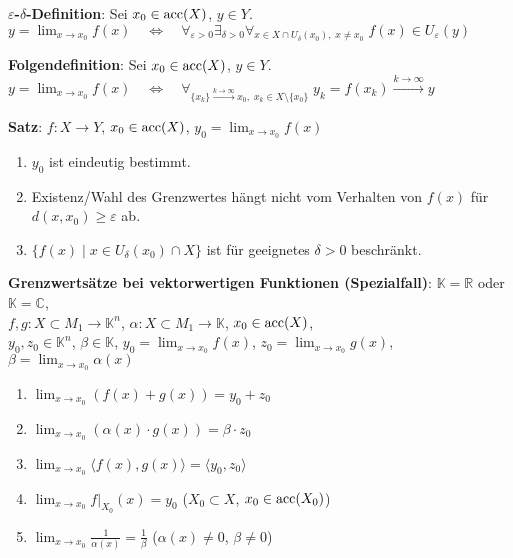 \textbf{$\varepsilon$-$\delta$-Definition}:
Sei $x_0 \in \operatorname{acc}(X)$, $y \in Y$. \\
$y = \lim_{x \to x_0} f(x) \quad\Leftrightarrow\quad
\forall_{\varepsilon > 0} \exists_{\delta > 0}
\forall_{x \in X \cap U_\delta(x_0),\; x \not= x_0}\;
f(x) \in U_\varepsilon(y)$

\textbf{Folgendefinition}:
Sei $x_0 \in \operatorname{acc}(X)$, $y \in Y$. \\
$y = \lim_{x \to x_0} f(x) \quad\Leftrightarrow\quad
\forall_{\{x_k\} \xrightarrow{k \to \infty} x_0,\;
x_k \in X \setminus \{x_0\}}\;
y_k = f(x_k) \xrightarrow{k \to \infty} y$

\linie

\textbf{Satz}: $f: X \rightarrow Y$,
$x_0 \in \operatorname{acc}(X)$, $y_0 = \lim_{x \to x_0} f(x)$

\begin{enumerate}
    \item $y_0$ ist eindeutig bestimmt.

    \item Existenz/Wahl des Grenzwertes hängt nicht vom Verhalten von
    $f(x)$ für $d(x,x_0) \ge \varepsilon$ ab.

    \item $\{f(x) \;|\; x \in U_\delta(x_0) \cap X\}$ ist für geeignetes
    $\delta > 0$ beschränkt.
\end{enumerate}

\linie
\pagebreak

\textbf{Grenzwertsätze bei vektorwertigen Funktionen (Spezialfall)}:
$\mathbb{K} = \mathbb{R}$ oder $\mathbb{K} = \mathbb{C}$, \\
$f, g: X \subset M_1 \rightarrow \mathbb{K}^n$, \quad
$\alpha: X \subset M_1 \rightarrow \mathbb{K}$, \quad
$x_0 \in \operatorname{acc}(X)$, \\
$y_0, z_0 \in \mathbb{K}^n$,
$\beta \in \mathbb{K}$, \quad
$y_0 = \lim_{x \to x_0} f(x)$,
$z_0 = \lim_{x \to x_0} g(x)$,
$\beta = \lim_{x \to x_0} \alpha(x)$

\begin{enumerate}
    \item $\lim_{x \to x_0} (f(x) + g(x)) = y_0 + z_0$

    \item $\lim_{x \to x_0} (\alpha(x) \cdot g(x)) = \beta \cdot z_0$

    \item $\lim_{x \to x_0} \langle f(x), g(x) \rangle =
    \langle y_0, z_0 \rangle$

    \item $\lim_{x \to x_0} f|_{X_0}(x) = y_0$ \qquad
    ($X_0 \subset X$, $x_0 \in \operatorname{acc}(X_0)$)

    \item $\lim_{x \to x_0} \frac{1}{\alpha(x)} = \frac{1}{\beta}$ \qquad
    ($\alpha(x) \not= 0$, $\beta \not= 0$)
\end{enumerate}

